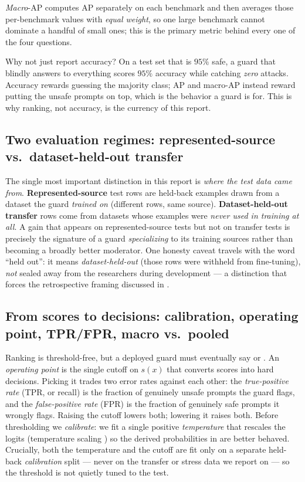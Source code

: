 \emph{Macro}-AP computes AP separately on each benchmark and then averages those per-benchmark values
with \emph{equal weight}, so one large benchmark cannot dominate a handful of small ones; this is the
primary metric behind every one of the four questions.

\begin{takeaway}{Why not just report accuracy?}
On a test set that is $95\%$ safe, a guard that blindly answers  to everything scores $95\%$
accuracy while catching \emph{zero} attacks. Accuracy rewards guessing the majority class; AP and
macro-AP instead reward putting the unsafe prompts on top, which is the behavior a guard is for. This
is why ranking, not accuracy, is the currency of this report.
\end{takeaway}

\subsection{Two evaluation regimes: represented-source vs.\ dataset-held-out transfer}
\label{sec:bg-regimes}

The single most important distinction in this report is \emph{where the test data came from}.
\textbf{Represented-source} test rows are held-back examples drawn from a dataset the guard
\emph{trained on} (different rows, same source). \textbf{Dataset-held-out transfer} rows come from
datasets whose examples were \emph{never used in training at all}. A gain that appears on
represented-source tests but not on transfer tests is precisely the signature of a guard
\emph{specializing} to its training sources rather than becoming a broadly better moderator. One
honesty caveat travels with the word ``held out'': it means \emph{dataset-held-out} (those rows were
withheld from fine-tuning), \emph{not} sealed away from the researchers during development --- a
distinction that forces the retrospective framing discussed in .

\subsection{From scores to decisions: calibration, operating point, TPR/FPR, macro vs.\ pooled}
\label{sec:bg-op}

Ranking is threshold-free, but a deployed guard must eventually say  or . An
\emph{operating point} is the single cutoff on $s(x)$ that converts scores into hard decisions. Picking
it trades two error rates against each other: the \emph{true-positive rate} (TPR, or recall) is the
fraction of genuinely unsafe prompts the guard flags, and the \emph{false-positive rate} (FPR) is the
fraction of genuinely safe prompts it wrongly flags. Raising the cutoff lowers both; lowering it raises
both. Before thresholding we \emph{calibrate}: we fit a single positive \emph{temperature} that rescales
the logits (temperature scaling \citep{guo2017calibration}) so the derived probabilities in
 are better behaved. Crucially, both the temperature and the cutoff are fit only on a
separate held-back \emph{calibration} split --- never on the transfer or stress data we report on --- so
the threshold is not quietly tuned to the test.

